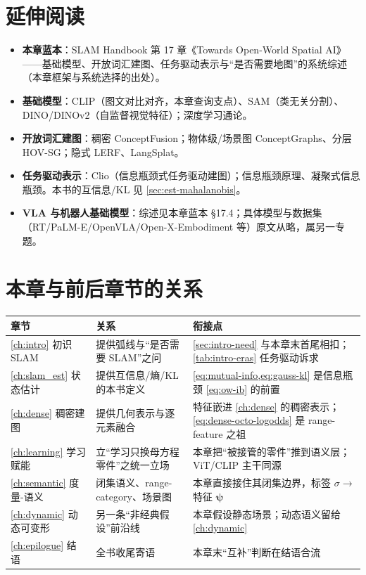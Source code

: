 \section*{延伸阅读}
\begin{itemize}
  \item \textbf{本章蓝本}：SLAM Handbook\cite{paull2026openworld} 第 17 章《Towards Open-World Spatial AI》——基础模型、开放词汇建图、任务驱动表示与“是否需要地图”的系统综述（本章框架与系统选择的出处）。
  \item \textbf{基础模型}：CLIP\cite{radford2021clip}（图文对比对齐，本章查询支点）、SAM\cite{kirillov2023sam}（类无关分割）、DINO/DINOv2\cite{caron2021dino,oquab2024dinov2}（自监督视觉特征）；深度学习通论\cite{goodfellow2016deeplearning}。
  \item \textbf{开放词汇建图}：稠密 ConceptFusion\cite{jatavallabhula2023conceptfusion}；物体级/场景图 ConceptGraphs\cite{gu2024conceptgraphs}、分层 HOV-SG\cite{werby2024hovsg}；隐式 LERF\cite{kerr2023lerf}、LangSplat\cite{qin2024langsplat}。
  \item \textbf{任务驱动表示}：Clio\cite{maggio2024clio}（信息瓶颈式任务驱动建图）；信息瓶颈原理\cite{tishby1999ib}、凝聚式信息瓶颈\cite{slonim1999aib}。本书的互信息/KL 见 \cref{sec:est-mahalanobis}。
  \item \textbf{VLA 与机器人基础模型}：综述见本章蓝本\cite{paull2026openworld} §17.4；具体模型与数据集（RT/PaLM-E/OpenVLA/Open-X-Embodiment 等）原文从略，属另一专题。
\end{itemize}

\section*{本章与前后章节的关系}
\begin{table}[H]\centering\small
\begin{tabular}{lll}
\toprule
章节 & 关系 & 衔接点 \\
\midrule
\cref{ch:intro} 初识 SLAM & 提供弧线与“是否需要 SLAM”之问 & \cref{sec:intro-need} 与本章末首尾相扣；\cref{tab:intro-eras} 任务驱动诉求 \\
\cref{ch:slam_est} 状态估计 & 提供互信息/熵/KL 的本书定义 & \cref{eq:mutual-info,eq:gauss-kl} 是信息瓶颈 \cref{eq:ow-ib} 的前置 \\
\cref{ch:dense} 稠密建图 & 提供几何表示与逐元素融合 & 特征嵌进 \cref{ch:dense} 的稠密表示；\cref{eq:dense-octo-logodds} 是 range-feature 之祖 \\
\cref{ch:learning} 学习赋能 & 立“学习只换母方程零件”之统一立场 & 本章把“被接管的零件”推到语义层；ViT/CLIP 主干同源 \\
\cref{ch:semantic} 度量-语义 & 闭集语义、range-category、场景图 & 本章直接接住其闭集边界，标签 $\sigma\to$ 特征 $\boldsymbol\psi$ \\
\cref{ch:dynamic} 动态可变形 & 另一条“非经典假设”前沿线 & 本章假设静态场景；动态语义留给 \cref{ch:dynamic} \\
\cref{ch:epilogue} 结语 & 全书收尾寄语 & 本章末“互补”判断在结语合流 \\
\bottomrule
\end{tabular}
\end{table}

